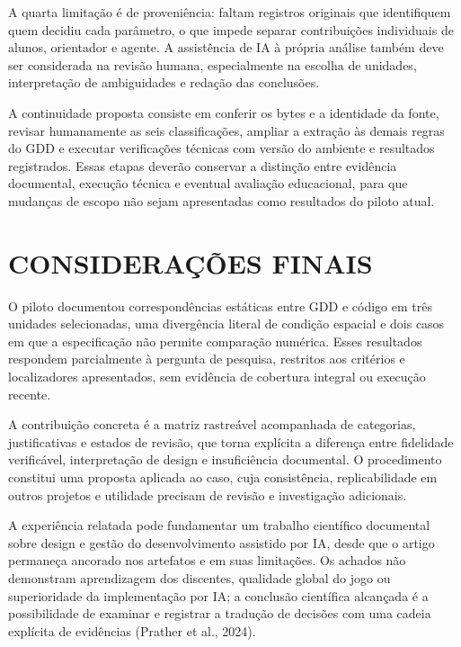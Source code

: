 A quarta limitação é de proveniência: faltam registros originais que identifiquem quem decidiu cada parâmetro, o que impede separar contribuições individuais de alunos, orientador e agente. A assistência de IA à própria análise também deve ser considerada na revisão humana, especialmente na escolha de unidades, interpretação de ambiguidades e redação das conclusões.

A continuidade proposta consiste em conferir os bytes e a identidade da fonte, revisar humanamente as seis classificações, ampliar a extração às demais regras do GDD e executar verificações técnicas com versão do ambiente e resultados registrados. Essas etapas deverão conservar a distinção entre evidência documental, execução técnica e eventual avaliação educacional, para que mudanças de escopo não sejam apresentadas como resultados do piloto atual.

\section{CONSIDERAÇÕES FINAIS}
O piloto documentou correspondências estáticas entre GDD e código em três unidades selecionadas, uma divergência literal de condição espacial e dois casos em que a especificação não permite comparação numérica. Esses resultados respondem parcialmente à pergunta de pesquisa, restritos aos critérios e localizadores apresentados, sem evidência de cobertura integral ou execução recente.

A contribuição concreta é a matriz rastreável acompanhada de categorias, justificativas e estados de revisão, que torna explícita a diferença entre fidelidade verificável, interpretação de design e insuficiência documental. O procedimento constitui uma proposta aplicada ao caso, cuja consistência, replicabilidade em outros projetos e utilidade precisam de revisão e investigação adicionais.

A experiência relatada pode fundamentar um trabalho científico documental sobre design e gestão do desenvolvimento assistido por IA, desde que o artigo permaneça ancorado nos artefatos e em suas limitações. Os achados não demonstram aprendizagem dos discentes, qualidade global do jogo ou superioridade da implementação por IA; a conclusão científica alcançada é a possibilidade de examinar e registrar a tradução de decisões com uma cadeia explícita de evidências (Prather et al., 2024).
